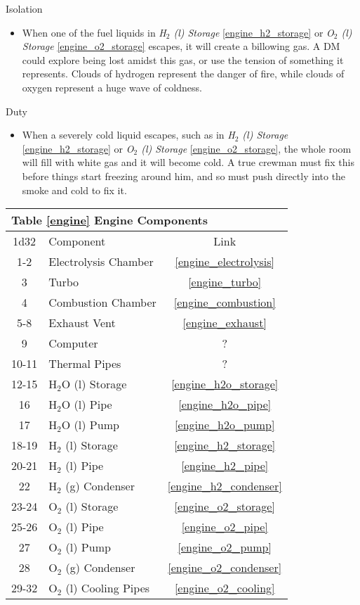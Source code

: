 \documentclass[a4paper]{article}
\begin{document}
\begin{minipage}[t]{0.4\linewidth}
Isolation
\begin{itemize}
\item When one of the fuel liquids in \textit{H$_2$ (l) Storage} \ref{engine_h2_storage} or \textit{O$_2$ (l) Storage} \ref{engine_o2_storage} escapes, it will create a billowing gas. A DM could explore being lost amidst this gas, or use the tension of something it represents. Clouds of hydrogen represent the danger of fire, while clouds of oxygen represent a huge wave of coldness. 
\end{itemize}
\end{minipage}
\begin{minipage}[t]{0.4\linewidth}
Duty
\begin{itemize}
\item When a severely cold liquid escapes, such as in \textit{H$_2$ (l) Storage} \ref{engine_h2_storage} or \textit{O$_2$ (l) Storage} \ref{engine_o2_storage}, the whole room will fill with white gas and it will become cold. A true crewman must fix this before things start freezing around him, and so must push directly into the smoke and cold to fix it.
\end{itemize}
\end{minipage}
 
\vspace{0.5cm}
\begin{tabular}{@{} | c | l | c | @{}}
\toprule
\multicolumn{3}{|l|}{Table \ref{engine} Engine Components} \\
\toprule
1d32 & Component & Link \\
\midrule
1-2 & Electrolysis Chamber & \ref{engine_electrolysis} \\
3 & Turbo & \ref{engine_turbo} \\
4 & Combustion Chamber & \ref{engine_combustion} \\
5-8 & Exhaust Vent & \ref{engine_exhaust} \\
9 & Computer & ? \\
10-11 & Thermal Pipes & ? \\
12-15 & H$_2$O (l) Storage & \ref{engine_h2o_storage} \\
16 & H$_2$O (l) Pipe & \ref{engine_h2o_pipe} \\
17 & H$_2$O (l) Pump & \ref{engine_h2o_pump} \\
18-19 & H$_2$ (l) Storage & \ref{engine_h2_storage} \\
20-21 & H$_2$ (l) Pipe & \ref{engine_h2_pipe} \\
22 & H$_2$ (g) Condenser & \ref{engine_h2_condenser} \\
23-24 & O$_2$ (l) Storage & \ref{engine_o2_storage} \\
25-26 & O$_2$ (l) Pipe & \ref{engine_o2_pipe} \\
27 & O$_2$ (l) Pump & \ref{engine_o2_pump} \\
28 & O$_2$ (g) Condenser & \ref{engine_o2_condenser} \\
29-32 & O$_2$ (l) Cooling Pipes & \ref{engine_o2_cooling} \\
\bottomrule
\end{tabular}
\end{document}
